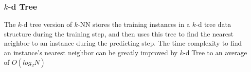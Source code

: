 \subsubsection{$k$-d Tree}
The $k$-d tree version of $k$-NN stores the training instances in a $k$-d tree data structure during the training step, and then uses this tree to find the nearest neighbor to an instance during the predicting step. The time complexity to find an instance's nearest neighbor can be greatly improved by $k$-d Tree to an average of $O(log_2N)$